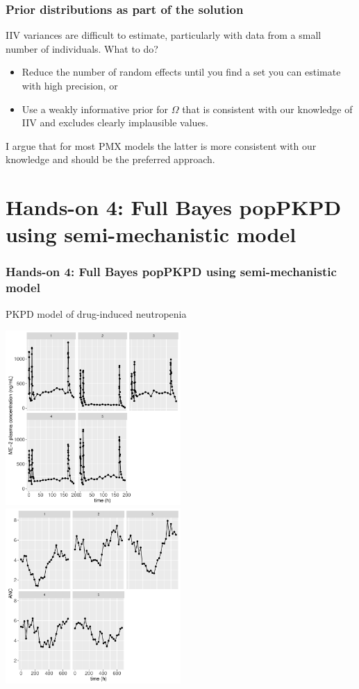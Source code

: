 \documentclass{beamer}
\begin{document}
\begin{frame}
  \frametitle{Prior distributions as part of the solution}
  
IIV variances are difficult to estimate, particularly with
    data from a small number of individuals. What to do?
  \begin{itemize}
  \item Reduce the number of random effects until you find a set you
    can estimate with high precision, or
\item Use a weakly informative prior for $\Omega$ that is consistent
  with our knowledge of IIV and excludes clearly
  implausible values.
  \end{itemize}
I argue that for most PMX models the latter is more consistent with
our knowledge and should be the preferred approach.



\end{frame}





\section{Hands-on 4: Full Bayes popPKPD using semi-mechanistic model}

\begin{frame}
  \frametitle{Hands-on 4: Full Bayes popPKPD using semi-mechanistic
    model}
  
PKPD model of drug-induced neutropenia

\begin{center}
\includegraphics[width=0.5\textwidth]{graphics/neutropenia1TorstenNcpPlots001.pdf}
\includegraphics[width=0.5\textwidth]{graphics/neutropenia1TorstenNcpPlots002.pdf}
\end{center}

\end{frame}
\end{document}
